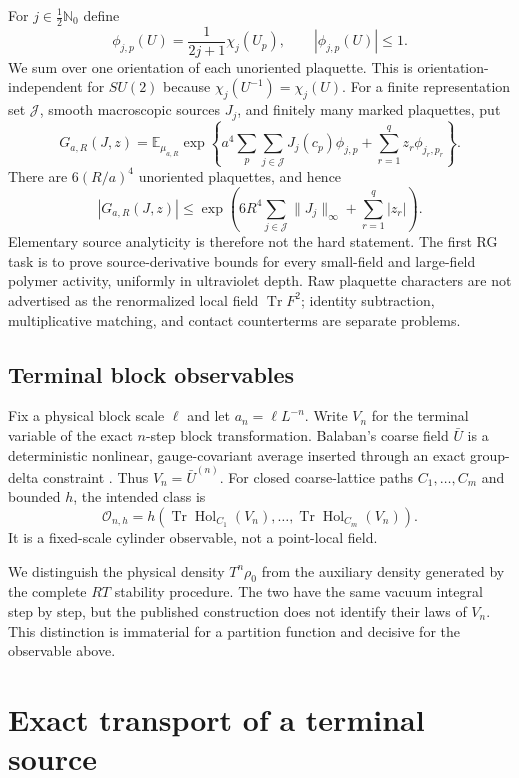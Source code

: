 \documentclass[11pt]{article}
\theoremstyle{definition}
\theoremstyle{remark}
\newcommand{\E}{\mathbb E}
\newcommand{\Tr}{\operatorname{Tr}}
\begin{document}
For $j\in\tfrac12\mathbb N_0$ define
\[
 \phi_{j,p}(U)=\frac{1}{2j+1}\chi_j(U_p),
 \qquad |\phi_{j,p}(U)|\le1.
\]
We sum over one orientation of each unoriented plaquette.  This is
orientation-independent for $SU(2)$ because
$\chi_j(U^{-1})=\chi_j(U)$.
For a finite representation set $\mathcal J$, smooth macroscopic sources $J_j$,
and finitely many marked plaquettes, put
\[
 G_{a,R}(J,z)=\E_{\mu_{a,R}}\exp\left\{
 a^4\sum_p\sum_{j\in\mathcal J}J_j(c_p)\phi_{j,p}
 +\sum_{r=1}^qz_r\phi_{j_r,p_r}\right\}.
\]
There are $6(R/a)^4$ unoriented plaquettes, and hence
\[
 |G_{a,R}(J,z)|\le
 \exp\left(6R^4\sum_{j\in\mathcal J}\lVert J_j\rVert_\infty
          +\sum_{r=1}^q|z_r|\right).
\]
Elementary source analyticity is therefore not the hard statement.  The first
RG task is to prove source-derivative bounds for every small-field and
large-field polymer activity, uniformly in ultraviolet depth.  Raw plaquette
characters are not advertised as the renormalized local field $\Tr F^2$;
identity subtraction, multiplicative matching, and contact counterterms are
separate problems.

\subsection{Terminal block observables}

Fix a physical block scale $\ell$ and let $a_n=\ell L^{-n}$.  Write $V_n$ for
the terminal variable of the exact $n$-step block transformation.  Balaban's
coarse field $\bar U$ is a deterministic nonlinear, gauge-covariant average
inserted through an exact group-delta constraint
\cite{Balaban1985Averaging,Balaban1988Convergent}.  Thus
$V_n=\bar U^{(n)}$.  For closed
coarse-lattice paths $C_1,\ldots,C_m$ and bounded $h$, the intended class is
\[
 \mathcal O_{n,h}=
 h\left(\Tr\operatorname{Hol}_{C_1}(V_n),\ldots,
        \Tr\operatorname{Hol}_{C_m}(V_n)\right).
\]
It is a fixed-scale cylinder observable, not a point-local field.

We distinguish the physical density $T^n\rho_0$ from the auxiliary density
generated by the complete $RT$ stability procedure.  The two have the same
vacuum integral step by step, but the published construction does not identify
their laws of $V_n$.  This distinction is immaterial for a partition function
and decisive for the observable above.

\section{Exact transport of a terminal source}
\end{document}
